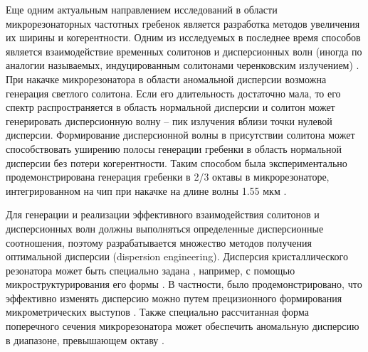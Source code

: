 Еще одним актуальным направлением исследований в области микрорезонаторных частотных гребенок является разработка методов увеличения их ширины и когерентности. Одним из исследуемых в последнее время способов является взаимодействие временных солитонов и дисперсионных волн (иногда по аналогии называемых, индуцированным  солитонами черенковским излучением) \cite{Brasch2016,Akhmediev1995,Barashenkov2011,Jang2014,Milian2014,Yang2016}. При накачке микрорезонатора в области аномальной дисперсии возможна генерация светлого солитона. Если его длительность достаточно мала, то его спектр распространяется в область нормальной дисперсии и солитон может генерировать дисперсионную волну – пик излучения вблизи точки нулевой дисперсии. Формирование дисперсионной волны в присутствии солитона может способствовать уширению полосы генерации гребенки в область нормальной дисперсии без потери когерентности. Таким способом была экспериментально продемонстрирована генерация гребенки в 2/3 октавы в микрорезонаторе, интегрированном на чип при накачке на длине волны 1.55 мкм \cite{Brasch2016}.


Для генерации и реализации эффективного взаимодействия солитонов и дисперсионных волн должны выполняться определенные дисперсионные соотношения, поэтому разрабатывается множество методов получения оптимальной дисперсии (dispersion engineering). Дисперсия кристаллического резонатора может быть специально задана \cite{Grudinin2012,Jiang2014,Okawachi2014,Zhang2014,Zhang2013,Grudinin2015,Nakagawa2016}, например, с помощью микроструктурирования его формы \cite{Grudinin2015,Nakagawa2016}. В частности, было продемонстрировано, что эффективно изменять дисперсию можно путем прецизионного формирования микрометрических выступов \cite{Grudinin2015}. Также специально рассчитанная форма поперечного сечения микрорезонатора может обеспечить аномальную дисперсию в диапазоне, превышающем октаву \cite{Nakagawa2016}.


